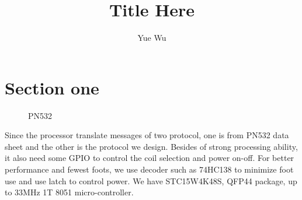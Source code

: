 \documentclass{sig-alternate-05-2015}
\begin{document}

\title{Title Here}

\author{
	\alignauthor
	Yue Wu\titlenote\\
}

\maketitle




\section{Section one}

    \begin{figure}
		\begin{center}
		\end{center}
		\caption{PN532}
	\end{figure}

    Since the processor translate messages of two protocol, one is from PN532 data sheet and the other is the protocol we design. Besides of strong processing ability, it also need some GPIO to control the coil selection and power on-off. For better performance and fewest foots, we use decoder such as 74HC138 to minimize foot use and use latch to control power. We have STC15W4K48S, QFP44 package, up to 33MHz 1T 8051 micro-controller.
\end{document}
